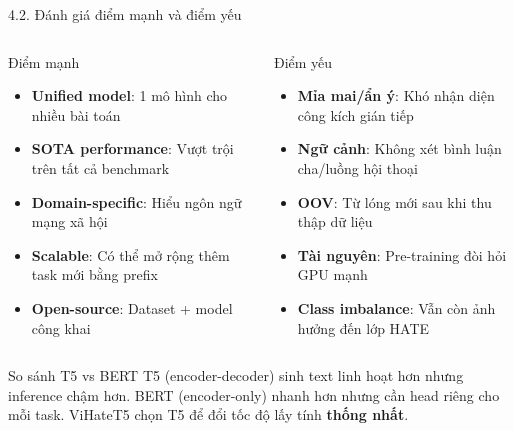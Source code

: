 \documentclass[11pt, aspectratio=169]{beamer}
\begin{document}
\begin{frame}[shrink=5]{4.2. Đánh giá điểm mạnh và điểm yếu}

\begin{columns}[T]
  \begin{block}{Điểm mạnh}
    \begin{itemize}
      \item \textbf{Unified model}: 1 mô hình cho nhiều bài toán
      \item \textbf{SOTA performance}: Vượt trội trên tất cả benchmark
      \item \textbf{Domain-specific}: Hiểu ngôn ngữ mạng xã hội
      \item \textbf{Scalable}: Có thể mở rộng thêm task mới bằng prefix
      \item \textbf{Open-source}: Dataset + model công khai
    \end{itemize}
  \end{block}

  \begin{block}{Điểm yếu}
    \begin{itemize}
      \item \textbf{Mỉa mai/ẩn ý}: Khó nhận diện công kích gián tiếp
      \item \textbf{Ngữ cảnh}: Không xét bình luận cha/luồng hội thoại
      \item \textbf{OOV}: Từ lóng mới sau khi thu thập dữ liệu
      \item \textbf{Tài nguyên}: Pre-training đòi hỏi GPU mạnh
      \item \textbf{Class imbalance}: Vẫn còn ảnh hưởng đến lớp HATE
    \end{itemize}
  \end{block}
\end{columns}

\vspace{0.3cm}
\begin{block}{So sánh T5 vs BERT}
  T5 (encoder-decoder) sinh text linh hoạt hơn nhưng inference chậm hơn. BERT (encoder-only) nhanh hơn nhưng cần head riêng cho mỗi task. ViHateT5 chọn T5 để đổi tốc độ lấy tính \textbf{thống nhất}.
\end{block}
\end{frame}
\end{document}

